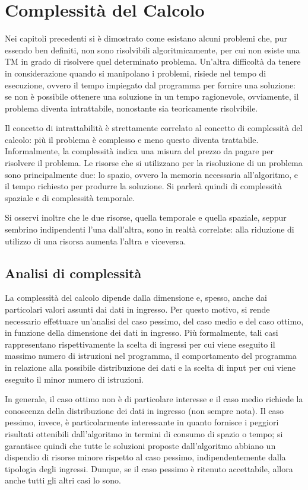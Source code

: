 \chapter{Complessità del Calcolo}
  Nei capitoli precedenti si è dimostrato come esistano alcuni problemi che, pur essendo ben definiti, non sono risolvibili algoritmicamente, per cui non esiste una TM in grado di risolvere quel determinato problema. Un'altra difficoltà da tenere in considerazione quando si manipolano i problemi, risiede nel tempo di esecuzione, ovvero il tempo impiegato dal programma per fornire una soluzione: se non è possibile ottenere una soluzione in un tempo ragionevole, ovviamente, il problema diventa intrattabile, nonostante sia teoricamente risolvibile.

  Il concetto di intrattabilità è strettamente correlato al concetto di complessità del calcolo: più il problema è complesso e meno questo diventa trattabile. Informalmente, la complessità indica una misura del prezzo da pagare per risolvere il problema. Le risorse che si utilizzano per la risoluzione di un problema sono principalmente due: lo spazio, ovvero la memoria necessaria all'algoritmo, e il tempo richiesto per produrre la soluzione. Si parlerà quindi di complessità spaziale e di complessità temporale.

  Si osservi inoltre che le due risorse, quella temporale e quella spaziale, seppur sembrino indipendenti l'una dall'altra, sono in realtà correlate: alla riduzione di utilizzo di una risorsa aumenta l'altra e viceversa. 

  \section{Analisi di complessità}
  La complessità del calcolo dipende dalla dimensione e, spesso, anche dai particolari valori assunti dai dati in ingresso. Per questo motivo, si rende necessario effettuare un'analisi del caso pessimo, del caso medio e del caso ottimo, in funzione della dimensione dei dati in ingresso. Più formalmente, tali casi rappresentano rispettivamente la scelta di ingressi per cui viene eseguito il massimo numero di istruzioni nel programma, il comportamento del programma in relazione alla possibile distribuzione dei dati e la scelta di input per cui viene eseguito il minor numero di istruzioni.

  In generale, il caso ottimo non è di particolare interesse e il caso medio richiede la conoscenza della distribuzione dei dati in ingresso (non sempre nota). Il caso pessimo, invece, è particolarmente interessante in quanto fornisce i peggiori risultati ottenibili dall'algoritmo in termini di consumo di spazio o tempo; si garantisce quindi che tutte le soluzioni proposte dall'algoritmo abbiano un dispendio di risorse minore rispetto al caso pessimo, indipendentemente dalla tipologia degli ingressi. Dunque, se il caso pessimo è ritenuto accettabile, allora anche tutti gli altri casi lo sono. 

